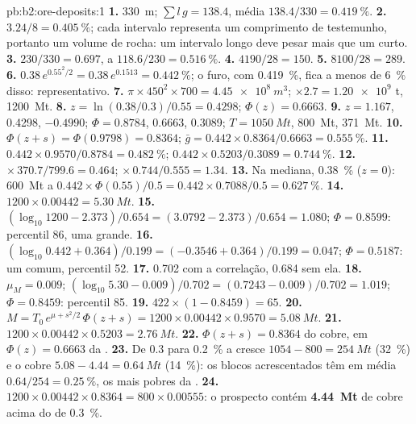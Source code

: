 \begin{solution}{pb:b2:ore-deposits:1}
\textbf{1.} \qty{330}{m}; $\sum l\,g = 138.4$, média $138.4/330 = \qty{0.419}{\percent}$.
\textbf{2.} $3.24/8 = \qty{0.405}{\percent}$; cada intervalo representa um comprimento de testemunho, portanto um
volume de rocha: um intervalo longo deve pesar mais que um curto.
\textbf{3.} $230/330 = 0.697$, a $118.6/230 = \qty{0.516}{\percent}$.
\textbf{4.} $4190/28 = 150$.
\textbf{5.} $8100/28 = 289$.
\textbf{6.} $0.38\,e^{0.55^2/2} = 0.38\,e^{0.1513} = \qty{0.442}{\percent}$; o furo, com
\qty{0.419}{\percent}, fica a menos de \qty{6}{\percent} disso: representativo.
\textbf{7.} $\pi \times 450^2 \times 700 = \qty{4.45e8}{m^3}$; $\times 2.7 = \num{1.20e9}$ t,
\qty{1200}{Mt}.
\textbf{8.} $z = \ln(0.38/0.3)/0.55 = 0.4298$; $\Phi(z) = 0.6663$.
\textbf{9.} $z = 1.167$, 0.4298, $-0.4990$; $\Phi = 0.8784$, 0.6663, 0.3089; $T = \qty{1050}{Mt}$,
\qty{800}{Mt}, \qty{371}{Mt}.
\textbf{10.} $\Phi(z + s) = \Phi(0.9798) = 0.8364$; $\bar g = 0.442 \times 0.8364/0.6663 =
\qty{0.555}{\percent}$.
\textbf{11.} $0.442 \times 0.9570/0.8784 = \qty{0.482}{\percent}$; $0.442 \times 0.5203/0.3089 =
\qty{0.744}{\percent}$.
\textbf{12.}  $\times\, 370.7/799.6 = 0.464$;  $\times\, 0.744/0.555 = 1.34$.
\textbf{13.} Na mediana, \qty{0.38}{\percent} ($z = 0$): \qty{600}{Mt} a $0.442 \times
\Phi(0.55)/0.5 = 0.442 \times 0.7088/0.5 = \qty{0.627}{\percent}$.
\textbf{14.} $1200 \times 0.00442 = \qty{5.30}{Mt}$.
\textbf{15.} $(\log_{10} 1200 - 2.373)/0.654 = (3.0792 - 2.373)/0.654 = 1.080$; $\Phi = 0.8599$:
percentil 86, uma  grande.
\textbf{16.} $(\log_{10} 0.442 + 0.364)/0.199 = (-0.3546 + 0.364)/0.199 = 0.047$; $\Phi = 0.5187$: um
 comum, percentil 52.
\textbf{17.} 0.702 com a correlação, 0.684 sem ela.
\textbf{18.} $\mu_M = 0.009$; $(\log_{10} 5.30 - 0.009)/0.702 = (0.7243 - 0.009)/0.702 = 1.019$; $\Phi =
0.8459$: percentil 85.
\textbf{19.} $422 \times (1 - 0.8459) = 65$.
\textbf{20.} $M = T_0\,e^{\mu + s^2/2}\,\Phi(z + s) = 1200 \times 0.00442 \times 0.9570 =
\qty{5.08}{Mt}$.
\textbf{21.} $1200 \times 0.00442 \times 0.5203 = \qty{2.76}{Mt}$.
\textbf{22.} $\Phi(z + s) = 0.8364$ do cobre, em $\Phi(z) = 0.6663$ da .
\textbf{23.} De 0.3 para \qty{0.2}{\percent} a  cresce $1054 - 800 = \qty{254}{Mt}$
(\qty{32}{\percent}) e o cobre $5.08 - 4.44 = \qty{0.64}{Mt}$ (\qty{14}{\percent}): os blocos
acrescentados têm em média $0.64/254 = \qty{0.25}{\percent}$, os mais pobres da .
\textbf{24.} $1200 \times 0.00442 \times 0.8364 = 800 \times 0.00555$: o prospecto contém
\textbf{\qty[text-series-to-math=true]{4.44}{Mt}} de cobre acima do  de \qty{0.3}{\percent}.
\end{solution}
